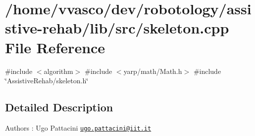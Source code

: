 \section{/home/vvasco/dev/robotology/assistive-\/rehab/lib/src/skeleton.cpp File Reference}
\label{skeleton_8cpp}
{\ttfamily \#include $<$algorithm$>$}\newline
{\ttfamily \#include $<$yarp/math/\+Math.\+h$>$}\newline
{\ttfamily \#include \char`\"{}Assistive\+Rehab/skeleton.\+h\char`\"{}}\newline


\subsection{Detailed Description}
\begin{DoxyAuthor}{Authors}
\+: Ugo Pattacini \href{mailto:ugo.pattacini@iit.it}{\tt ugo.\+pattacini@iit.\+it} 
\end{DoxyAuthor}
